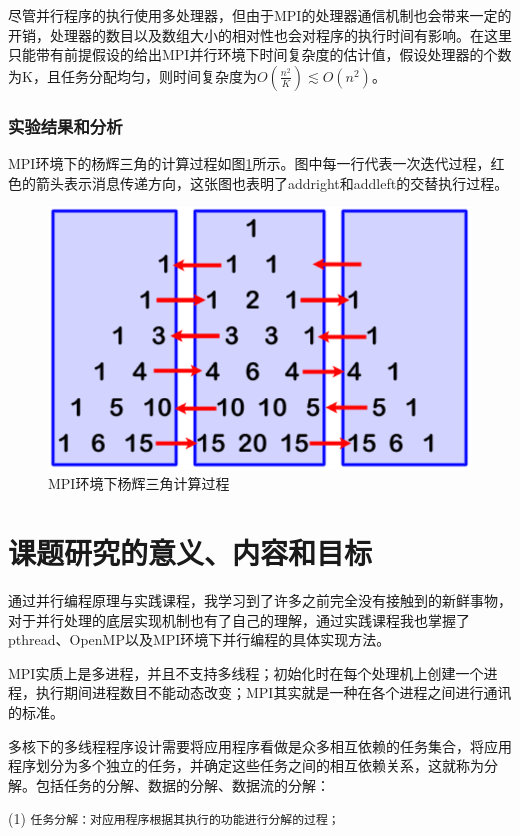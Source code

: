 \documentclass[supercite]{Experimental_Report}
\theoremstyle{definition}
\begin{document}
尽管并行程序的执行使用多处理器，但由于MPI的处理器通信机制也会带来一定的开销，处理器的数目以及数组大小的相对性也会对程序的执行时间有影响。在这里只能带有前提假设的给出MPI并行环境下时间复杂度的估计值，假设处理器的个数为K，且任务分配均匀，则时间复杂度为$O(\frac{n^2}{K})\lesssim O(n^2)$。

\subsubsection{实验结果和分析}
MPI环境下的杨辉三角的计算过程如图\ref{fig:p5}所示。图中每一行代表一次迭代过程，红色的箭头表示消息传递方向，这张图也表明了addright和addleft的交替执行过程。
\begin{figure}[ht]
\centering
\includegraphics[scale=0.7]{杨辉三角02.png}
\caption{MPI环境下杨辉三角计算过程}
\label{fig:p5}
\end{figure}

\newpage
\section{课题研究的意义、内容和目标}
通过并行编程原理与实践课程，我学习到了许多之前完全没有接触到的新鲜事物，对于并行处理的底层实现机制也有了自己的理解，通过实践课程我也掌握了pthread、OpenMP以及MPI环境下并行编程的具体实现方法。

MPI实质上是多进程，并且不支持多线程；初始化时在每个处理机上创建一个进程，执行期间进程数目不能动态改变；MPI其实就是一种在各个进程之间进行通讯的标准。

多核下的多线程程序设计需要将应用程序看做是众多相互依赖的任务集合，将应用程序划分为多个独立的任务，并确定这些任务之间的相互依赖关系，这就称为分解。包括任务的分解、数据的分解、数据流的分解：

(1) \texttt{任务分解：对应用程序根据其执行的功能进行分解的过程；}
\end{document}
